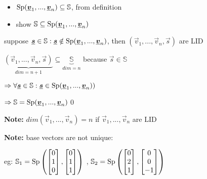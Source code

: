 \begin{itemize}
\item $\operatorname{Sp}(\underline{\boldsymbol {v}}_1,...,\underline{\boldsymbol {v}}_n)\subseteq \mathbb{S}$, from definition
\item show $\mathbb{S}\subseteq \operatorname{Sp}(\underline{\boldsymbol {v}}_1,...,\underline{\boldsymbol {v}}_n)$ 
\end{itemize}
\begin{doublespace}
	suppose $\underline{\boldsymbol {s}}\in\mathbb{S}: \underline{\boldsymbol {s}}\notin \operatorname{Sp}(\underline{\boldsymbol {v}}_1,...,\underline{\boldsymbol {v}}_n)$, then $(\vec{v}_1,...,\vec{v}_n,\vec{s})$ are LID 

$\underbrace{(\vec{v}_1,...,\vec{v}_n,\vec{s})}_{dim=n+1}\subseteq \underbrace{\mathbb{S}}_{dim =n}$ because $\vec{s}\in\mathbb{S}$

$\Rightarrow \forall \underline{\boldsymbol {s}}\in\mathbb{S}: \underline{\boldsymbol {s}}\in \operatorname{Sp}(\underline{\boldsymbol {v}}_1,...,\underline{\boldsymbol {v}}_n))$

$\Rightarrow \mathbb{S}= \operatorname{Sp}(\underline{\boldsymbol {v}}_1,...,\underline{\boldsymbol {v}}_n)$\qed

\textbf{Note:} $dim(\vec{v}_1,...,\vec{v}_n)=n $ if $\vec{v}_1,...,\vec{v}_n$ are LID


\textbf{Note:} base vectors are not unique: 

eg: $\mathbb{S}_1=\operatorname{Sp}\left(\begin{bmatrix}0\\1\\0\end{bmatrix},\begin{bmatrix}0\\1\\1\end{bmatrix}\right)$ ,
$\mathbb{S}_2=\operatorname{Sp}\left(\begin{bmatrix}0\\2\\1\end{bmatrix},\begin{bmatrix}0\\0\\-1\end{bmatrix}\right)$



\end{doublespace}
